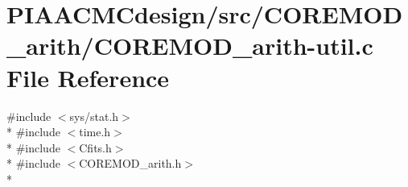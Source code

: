 \hypertarget{PIAACMCdesign_2src_2COREMOD__arith_2COREMOD__arith-util_8c}{\section{P\+I\+A\+A\+C\+M\+Cdesign/src/\+C\+O\+R\+E\+M\+O\+D\+\_\+arith/\+C\+O\+R\+E\+M\+O\+D\+\_\+arith-\/util.c File Reference}
\label{PIAACMCdesign_2src_2COREMOD__arith_2COREMOD__arith-util_8c}
}
{\ttfamily \#include $<$sys/stat.\+h$>$}\\*
{\ttfamily \#include $<$time.\+h$>$}\\*
{\ttfamily \#include $<$Cfits.\+h$>$}\\*
{\ttfamily \#include $<$C\+O\+R\+E\+M\+O\+D\+\_\+arith.\+h$>$}\\*
